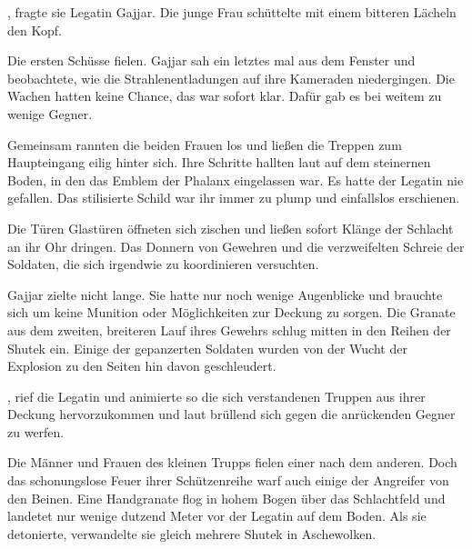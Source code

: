 \par

, fragte sie Legatin Gajjar. Die junge Frau schüttelte mit einem bitteren Lächeln den Kopf. 

\par

Die ersten Schüsse fielen. Gajjar sah ein letztes mal aus dem Fenster und beobachtete, wie die Strahlenentladungen auf ihre Kameraden niedergingen. Die Wachen hatten keine Chance, das war sofort klar. Dafür gab es bei weitem zu wenige Gegner.

\par

Gemeinsam rannten die beiden Frauen los und ließen die Treppen zum Haupteingang eilig hinter sich. Ihre Schritte hallten laut auf dem steinernen Boden, in den das Emblem der Phalanx eingelassen war. Es hatte der Legatin nie gefallen. Das stilisierte Schild war ihr immer zu plump und einfallslos erschienen.

\par

Die Türen Glastüren öffneten sich zischen und ließen sofort Klänge der Schlacht an ihr Ohr dringen. Das Donnern von Gewehren und die verzweifelten Schreie der Soldaten, die sich irgendwie zu koordinieren versuchten.

\par

Gajjar zielte nicht lange. Sie hatte nur noch wenige Augenblicke und brauchte sich um keine Munition oder Möglichkeiten zur Deckung zu sorgen. Die Granate aus dem zweiten, breiteren Lauf ihres Gewehrs schlug mitten in den Reihen der Shutek ein. Einige der gepanzerten Soldaten wurden von der Wucht der Explosion zu den Seiten hin davon geschleudert.

\par

, rief die Legatin und animierte so die sich verstandenen Truppen aus ihrer Deckung hervorzukommen und laut brüllend sich gegen die anrückenden Gegner zu werfen.

\par

Die Männer und Frauen des kleinen Trupps fielen einer nach dem anderen. Doch das schonungslose Feuer ihrer Schützenreihe warf auch einige der Angreifer von den Beinen. Eine Handgranate flog in hohem Bogen über das Schlachtfeld und landetet nur wenige dutzend Meter vor der Legatin auf dem Boden. Als sie detonierte, verwandelte sie gleich mehrere Shutek in Aschewolken.

